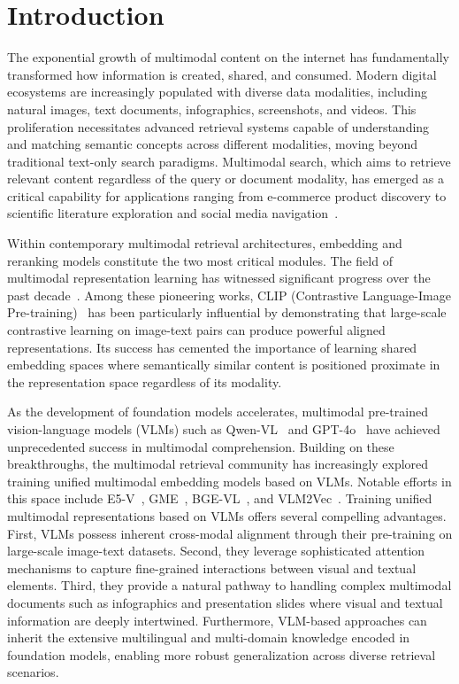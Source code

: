 \documentclass{article} %
\begin{document}
\section{Introduction}
The exponential growth of multimodal content on the internet has fundamentally transformed how information is created, shared, and consumed. Modern digital ecosystems are increasingly populated with diverse data modalities, including natural images, text documents, infographics, screenshots, and videos. This proliferation necessitates advanced retrieval systems capable of understanding and matching semantic concepts across different modalities, moving beyond traditional text-only search paradigms. Multimodal search, which aims to retrieve relevant content regardless of the query or document modality, has emerged as a critical capability for applications ranging from e-commerce product discovery to scientific literature exploration and social media navigation~\citep{faysse2025colpali,fu2025moon}.

Within contemporary multimodal retrieval architectures, embedding and reranking models constitute the two most critical modules. The field of multimodal representation learning has witnessed significant progress over the past decade~\citep{manzoor2023multimodality,mei2025survey}. Among these pioneering works, CLIP (Contrastive Language-Image Pre-training)~\citep{radford2021learning} has been particularly influential by demonstrating that large-scale contrastive learning on image-text pairs can produce powerful aligned representations. Its success has cemented the importance of learning shared embedding spaces where semantically similar content is positioned proximate in the representation space regardless of its modality. 

As the development of foundation models accelerates, multimodal pre-trained vision-language models (VLMs) such as Qwen-VL~\citep{wang2024qwen2,Qwen3-VL} and GPT-4o~\citep{hurst2024gpt} have achieved unprecedented success in multimodal comprehension. Building on these breakthroughs, the multimodal retrieval community has increasingly explored training unified multimodal embedding models based on VLMs. Notable efforts in this space include E5-V~\citep{jiang2024e5}, GME~\citep{zhang2025bridging}, BGE-VL~\citep{zhou2025megapairs}, and VLM2Vec~\citep{meng2025vlm2vec,jiang2025vlm2vec}. Training unified multimodal representations based on VLMs offers several compelling advantages. First, VLMs possess inherent cross-modal alignment through their pre-training on large-scale image-text datasets. Second, they leverage sophisticated attention mechanisms to capture fine-grained interactions between visual and textual elements. Third, they provide a natural pathway to handling complex multimodal documents such as infographics and presentation slides where visual and textual information are deeply intertwined. Furthermore, VLM-based approaches can inherit the extensive multilingual and multi-domain knowledge encoded in foundation models, enabling more robust generalization across diverse retrieval scenarios.
\end{document}
